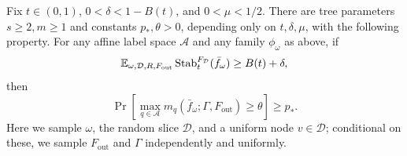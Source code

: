 \begin{proposition}\label{prop:extraction}
Fix $t\in(0,1)$, $0<\delta<1-B(t)$, and $0<\mu<1/2$.
There are tree parameters $s\ge2,m\ge1$ and constants $p_*,\theta>0$,
depending only on $t,\delta,\mu$, with the following property.
For any affine label space $\mathcal A$ and any family $\phi_\omega$ as above,
if
\begin{equation}\label{eq:excess-stability}
 \mathbb E_{\omega,\mathcal D,R,F_{\mathrm{out}}}
 \operatorname{Stab}_t^{F_{\mathcal D}}(\bar f_\omega)
 \ge B(t)+\delta,
\end{equation}
then
\begin{equation}\label{eq:extraction-event}
 \Pr\left[
   \max_{q\in\mathcal A}
   m_q(\bar f_\omega;\Gamma,F_{\mathrm{out}})\ge\theta
 \right]\ge p_*.
\end{equation}
Here we sample $\omega$, the random slice $\mathcal D$, and a uniform
node $v\in\mathcal D$; conditional on these, we sample
$F_{\mathrm{out}}$ and $\Gamma$ independently and uniformly.
\end{proposition}

